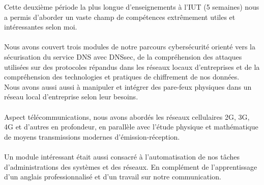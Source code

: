 \begin{resumo}

    Cette deuxième période la plus longue d'enseignements à l'IUT (5 semaines) nous a permis d'aborder un vaste champ de compétences extrêmement utiles et intéressantes selon moi.
    \\ \\
    Nous avons couvert trois modules de notre parcours cybersécurité orienté vers la sécurisation du service DNS avec DNSsec, de la compréhension des attaques utilisées sur des protocoles répandus dans les réseaux locaux d'entreprises et de la compréhension des technologies et pratiques de chiffrement de nos données.
    \\
    Nous avons aussi aussi à manipuler et intégrer des pare-feux physiques dans un réseau local d'entreprise selon leur besoins.
    \\ \\
    Aspect télécommunications, nous avons abordés les réseaux cellulaires 2G, 3G, 4G et d'autres en profondeur, en parallèle avec l'étude physique et mathématique de moyens transmissions modernes d'émission-réception.
    \\ \\
    Un module intéressant était aussi consacré à l'automatisation de nos tâches d'administrations des systèmes et des réseaux. En complément de l'apprentissage d'un anglais professionnalisé et d'un travail sur notre communication.
    
\end{resumo}